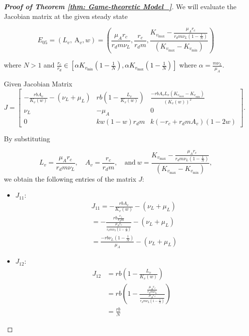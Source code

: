 \documentclass{article}
\theoremstyle{remark}
\theoremstyle{custom} %
\begin{document}
\begin{proof}[\textbf{Proof of Theorem \ref{thm: Game-theoretic Model_}}]

We will evaluate the Jacobian matrix at the given steady state

$$E_{05} =
\left(L_v, \mathrm{~A}_v, w\right)=\left(\frac{\mu_A r_c}{r_d m \nu_L}, \frac{r_c}{r_d m}, \frac{K_{v_{\max }}-\frac{\mu_A  r_c}{r_d m \nu_L\left(1-\frac{1}{N}\right)}}{\left(K_{v_{\max }}-K_{v_{\min }}\right)}\right)
$$

where $N>1$ and \textcolor{black}{$\frac{r_c}{r_d} \in\left[\alpha K_{v_{\min }}\left(1-\frac{1}{N}\right), \alpha K_{v_{\max }}\left(1-\frac{1}{N}\right)\right]$} where $\alpha=\frac{m \nu_L}{\mu_A}.$  


Given Jacobian Matrix $
J=\left[\begin{array}{ccc}
-\frac{r b A_v}{K_v(w)}-\left(\nu_L+\mu_L\right) & r b\left(1-\frac{L_v}{K_v(w)}\right) & \frac{-r b A_v L_v\left(K_{v_{\max }}-K_{v_{\min }}\right)}{\left(K_v(w)\right)^2} \\
\nu_L & -\mu_A & 0 \\
0 & k w(1-w) r_d m & k\left(-r_c+r_d m A_v\right)(1-2 w)
\end{array}\right].
$

By substituting

$$
L_v  =\frac{\mu_A r_c}{r_d m \nu_L}, \quad  
A_v  =\frac{r_c}{r_d m},\quad  \text{and} \ 
w  =\frac{K_{v_{\max }}-\frac{\mu_A r_c}{r_d m \nu_L\left(1-\frac{1}{N}\right)}}{\left(K_{v_{\max }}-K_{v_{\min }}\right)},
$$
we obtain the following entries of the matrix $J$:

\begin{itemize}

\item $J_{11}:$
$$
\begin{aligned}
& J_{11}=-\frac{r b A_v}{K_v(w)}-\left(\nu_L+\mu_L\right) \\
& =-\frac{rb\frac{r_c}{r_d m}}{\frac{\mu_A r_c}{r_d  m \nu_L\left(1-\frac{1}{N}\right)}}-\left(\nu_L+\mu_L\right) \\
& =\frac{-r b\nu_L\left(1-\frac{1}{N}\right)}{\mu_A}-\left(\nu_L+\mu_L\right)
\end{aligned}
$$

\item $J_{12}:$
$$
\begin{aligned}
J_{12} & =r b \left(1-\frac{L_v}{K_v(w)}\right) \\
& =r b\left(1-\frac{\frac{\mu_A r_c}{r_d m \nu_L}}{\frac{\mu_A r_c}{r_d m \nu_L\left(1-\frac{1}{N}\right)}}\right) \\
& =\frac{rb}{N}
\end{aligned}
$$


\end{itemize}
\end{proof}
\end{document}
